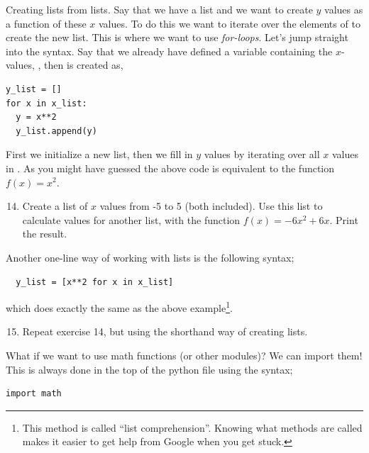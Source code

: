 \documentclass{article}
\begin{document}
Creating lists from lists. Say that we have a list 
and we want to create $y$ values as a function of these $x$ values.
To do this we want to iterate over the elements of  to create the new list.
This is where we want to use {\em for-loops}.
Let's jump straight into the syntax. Say that we already
have defined a variable containing the $x$-values, ,
then  is created as,

\begin{lstlisting}
y_list = []
for x in x_list:
  y = x**2
  y_list.append(y)
\end{lstlisting}

First we initialize a new list,
then we fill in $y$ values by iterating over
all $x$ values in .
As you might have guessed the above code is equivalent to 
the function $f(x) = x^2$.\\

\begin{enumerate}
  \setcounter{enumi}{13}
  \item Create a list of $x$ values from -5 to 5 (both included). Use this list
    to calculate values for another list, with the function $f(x) = -6x^2 + 6x$.
    Print the result.

\end{enumerate}

Another one-line way of working with lists is the following syntax;

\begin{lstlisting}
  y_list = [x**2 for x in x_list]
\end{lstlisting}

which does exactly the same as the above example\footnote{This method is
called ``list comprehension''. Knowing what methods are called makes
it easier to get help from Google when you get stuck. }.

\begin{enumerate}
  \setcounter{enumi}{14}
  \item Repeat exercise 14, but using the shorthand way of creating lists.
\end{enumerate}

What if we want to use math functions (or other modules)?
We can import them! This is always done in the top of the
python file using the syntax;

\begin{lstlisting}
import math
\end{lstlisting}
\end{document}

